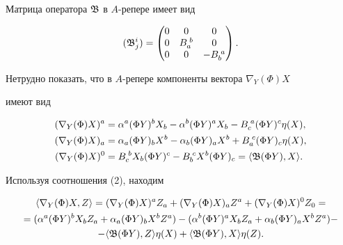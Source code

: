 Матрица оператора $\frak B$ в $A$-репере имеет вид \cite {10}


$$


(\frak B^i_j)=


\begin{pmatrix}


0 & 0 & 0\\


0 & B_a^{\;b} & 0\\


0 & 0 & -B_b^{\;a}


\end{pmatrix}.


$$ 





Нетрудно показать, что в $A$-репере компоненты вектора $\nabla_Y(\Phi)X$ 


имеют вид


\begin{align}


(\nabla_Y(\Phi)X)^a&=\alpha^a(\Phi Y)^b X_b - \alpha^b(\Phi Y)^a X_b -


B_c^{\;a}(\Phi Y)^c \eta (X),\notag \\


(\nabla_Y(\Phi)X)_a&=\alpha_a(\Phi Y)_b X^b - \alpha_b(\Phi Y)_a X^b +


B_a^{\;c}(\Phi Y)_c \eta (X),\\ 


(\nabla_Y(\Phi)X)^0&=B_c^{\;b} X_b(\Phi Y)^c- B_b^{\;c} X^b(\Phi Y)_c=


\langle \frak B(\Phi Y),X \rangle.\notag


\end{align}


Используя соотношения (2), находим


\begin{multline}


\langle \nabla_Y(\Phi)X,Z \rangle=


(\nabla_Y(\Phi)X)^a Z_a+(\nabla_Y(\Phi)X)_a Z^a+


(\nabla_Y(\Phi)X)^0 Z_0=\\


=(\alpha^a(\Phi Y)^b X_b Z_a+\alpha_a(\Phi Y)_b X^b Z^a)-


(\alpha^b(\Phi Y)^a X_b Z_a+\alpha_b(\Phi Y)_a X^b Z^a)- \\


-\langle \frak B(\Phi Y),Z \rangle \eta (X)+


\langle \frak B(\Phi Y),X \rangle \eta (Z).


\end{multline}





